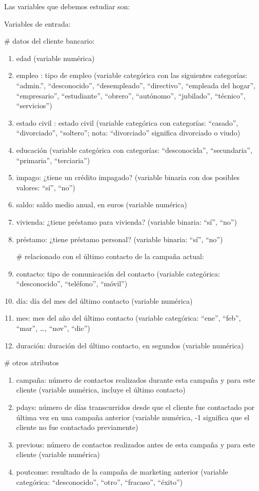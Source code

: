 \documentclass[
  letterpaper,
  DIV=11,
  numbers=noendperiod]{scrreprt}
\begin{document}
Las variables que debemos estudiar son:

Variables de entrada:

\# datos del cliente bancario:

\begin{enumerate}
\def\labelenumi{\arabic{enumi}.}
\item
  edad (variable numérica)
\item
  empleo : tipo de empleo (variable categórica con las siguientes
  categorías: ``admin.'', ``desconocido'', ``desempleado'',
  ``directivo'', ``empleada del hogar'', ``empresario'', ``estudiante'',
  ``obrero'', ``autónomo'', ``jubilado'', ``técnico'', ``servicios'')
\item
  estado civil : estado civil (variable categórica con categorías:
  ``casado'', ``divorciado'', ``soltero''; nota: ``divorciado''
  significa divorciado o viudo)
\item
  educación (variable categórica con categorías: ``desconocida'',
  ``secundaria'', ``primaria'', ``terciaria'')
\item
  impago: ¿tiene un crédito impagado? (variable binaria con dos posibles
  valores: ``sí'', ``no'')
\item
  saldo: saldo medio anual, en euros (variable numérica)
\item
  vivienda: ¿tiene préstamo para vivienda? (variable binaria: ``sí'',
  ``no'')
\item
  préstamo: ¿tiene préstamo personal? (variable binaria: ``sí'', ``no'')

  \# relacionado con el último contacto de la campaña actual:
\item
  contacto: tipo de comunicación del contacto (variable categórica:
  ``desconocido'', ``teléfono'', ``móvil'')
\item
  día: día del mes del último contacto (variable numérica)
\item
  mes: mes del año del último contacto (variable categórica: ``ene'',
  ``feb'', ``mar'', \ldots, ``nov'', ``dic'')
\item
  duración: duración del último contacto, en segundos (variable
  numérica)
\end{enumerate}

\# otros atributos

\begin{enumerate}
\def\labelenumi{\arabic{enumi}.}
\setcounter{enumi}{12}
\item
  campaña: número de contactos realizados durante esta campaña y para
  este cliente (variable numérica, incluye el último contacto)
\item
  pdays: número de días transcurridos desde que el cliente fue
  contactado por última vez en una campaña anterior (variable numérica,
  -1 significa que el cliente no fue contactado previamente)
\item
  previous: número de contactos realizados antes de esta campaña y para
  este cliente (variable numérica)
\item
  poutcome: resultado de la campaña de marketing anterior (variable
  categórica: ``desconocido'', ``otro'', ``fracaso'', ``éxito'')
\end{enumerate}
\end{document}
